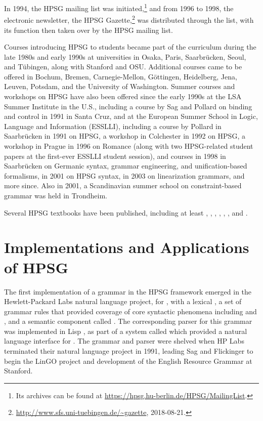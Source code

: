 \documentclass[output=paper
                ,modfonts
                ,nonflat
	        ,collection
	        ,collectionchapter
	        ,collectiontoclongg
 	        ,biblatex
                ,babelshorthands
                ,newtxmath
                ,draftmode
                ,colorlinks, citecolor=brown
]{./langsci/langscibook}
\begin{document}
In 1994, the HPSG mailing list was initiated,\footnote{Its archives can be found at \url{https://hpsg.hu-berlin.de/HPSG/MailingList}.} and from 1996 to 1998, the electronic newsletter, the HPSG Gazette,\footnote{\url{http://www.sfs.uni-tuebingen.de/~gazette}, 2018-08-21.} was distributed through the list, with its function then taken over by the HPSG mailing list.

Courses introducing HPSG to students became part of the curriculum during the late 1980s and early 1990s at universities in Osaka, Paris, Saarbr{\"u}cken, Seoul, and T{\"u}bingen, along with Stanford and OSU.  Additional courses came to be offered in Bochum, Bremen, Carnegie-Mellon, G{\"o}ttingen, Heidelberg, Jena, Leuven, Potsdam, and the University of Washington.  Summer courses and workshops on HPSG have also been offered since the early 1990s at the LSA Summer Institute in the U.S., including a course by Sag and Pollard on binding and control in 1991 in Santa Cruz, and at the European Summer School in Logic, Language and Information (ESSLLI), including a course by Pollard in Saarbr{\"u}cken in 1991 on HPSG, a workshop in Colchester in 1992 on HPSG, a workshop in Prague in 1996 on Romance (along with two HPSG-related student papers at the first-ever ESSLLI student session), and courses in 1998 in Saarbr{\"u}cken on Germanic syntax, grammar engineering, and unification-based formalisms, in 2001 on HPSG syntax, in 2003 on linearization grammars, and more since.  Also in 2001, a Scandinavian summer school on constraint-based grammar was held in Trondheim.

Several HPSG textbooks have been published, including at least \citet{Borsley91a,Borsley96a-u}, \citet{SagW99a-u}, \citet*{SWB2003a}, \citet{MuellerLehrbuch1,MuellerGTBuch2}, \citet{MuellerGT-Eng1}, \citet{Kim2016a-u}, and \citet{Levine2017a-u}.   

\section{Implementations and Applications of HPSG}

The first implementation of a grammar in the HPSG framework emerged in the Hewlett-Packard Labs natural language project, for , with a lexical  \citep*{FPW85a}, a set of grammar rules that provided coverage of core syntactic phenomena including  and , and a semantic component called  \citep{LaubNerb1991}.  The corresponding parser for this grammar was implemented in Lisp \citep{PP85}, as part of a system called  \citep{NerProud1987} which provided a natural language interface for .  The grammar and parser were shelved when HP Labs terminated their natural language project in 1991, leading Sag and Flickinger to begin the LinGO project and development of the English Resource Grammar at Stanford.
\end{document}
